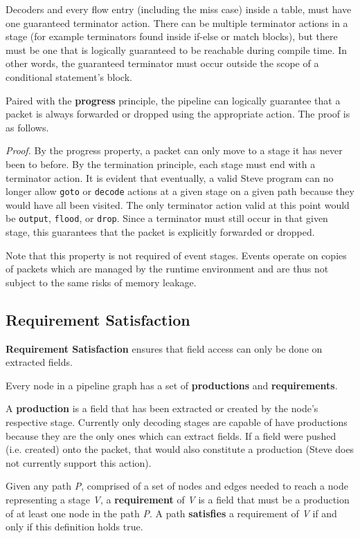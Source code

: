 Decoders and every flow entry (including the miss case) inside a table, must have one guaranteed terminator action. There can be multiple terminator actions in a stage (for example terminators found inside if-else or match blocks), but there must be one that is logically guaranteed to be reachable during compile time. In other words, the guaranteed terminator must occur outside the scope of a conditional statement's block.

Paired with the \textbf{progress} principle, the pipeline can logically guarantee that a packet is always forwarded or dropped using the appropriate action. The proof is as follows.

\textit{Proof.} By the progress property, a packet can only move to a stage it has never been to before. By the termination principle, each stage must end with a terminator action. It is evident that eventually, a valid Steve program can no longer allow \texttt{goto} or \texttt{decode} actions at a given stage on a given path because they would have all been visited. The only terminator action valid at this point would be \texttt{output}, \texttt{flood}, or \texttt{drop}. Since a terminator must still occur in that given stage, this guarantees that the packet is explicitly forwarded or dropped.

Note that this property is not required of event stages. Events operate on copies of packets which are managed by the runtime environment and are thus not subject to the same risks of memory leakage.

\subsection{Requirement Satisfaction} \label{requirements_guide}

\textbf{Requirement Satisfaction} ensures that field access can only be done on extracted fields. 

Every node in a pipeline graph has a set of \textbf{productions} and \textbf{requirements}.

A \textbf{production} is a field that has been extracted or created by the node's respective stage. Currently only decoding stages are capable of have productions because they are the only ones which can extract fields. If a field were pushed (i.e. created) onto the packet, that would also constitute a production (Steve does not currently support this action).

Given any path \textit{P}, comprised of a set of nodes and edges needed to reach a node representing a stage \textit{V}, a \textbf{requirement} of \textit{V} is a field that must be a production of at least one node in the path \textit{P}. A path \textbf{satisfies} a requirement of \textit{V} if and only if this definition holds true.

